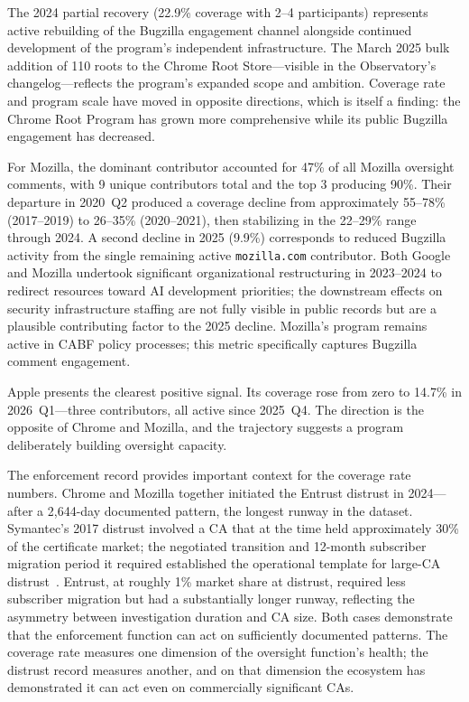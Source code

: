 \documentclass[10pt,twocolumn,letterpaper]{article}
\begin{document}
The 2024 partial recovery (22.9\% coverage with 2--4 participants)
represents active rebuilding of the Bugzilla engagement channel alongside
continued development of the program's independent infrastructure. The
March 2025 bulk addition of 110 roots to the Chrome Root Store---visible
in the Observatory's changelog---reflects the program's expanded scope and
ambition. Coverage rate and program scale have moved in opposite directions,
which is itself a finding: the Chrome Root Program has grown more
comprehensive while its public Bugzilla engagement has decreased.

For Mozilla, the dominant contributor accounted for 47\% of all Mozilla
oversight comments, with 9 unique contributors total and the top 3
producing 90\%. Their departure in 2020~Q2 produced a coverage decline
from approximately 55--78\% (2017--2019) to 26--35\% (2020--2021), then
stabilizing in the 22--29\% range through 2024. A second decline in 2025
(9.9\%) corresponds to reduced Bugzilla activity from the single remaining
active \texttt{mozilla.com} contributor. Both Google and Mozilla undertook
significant organizational restructuring in 2023--2024 to redirect
resources toward AI development priorities; the downstream effects on
security infrastructure staffing are not fully visible in public records
but are a plausible contributing factor to the 2025 decline. Mozilla's
program remains active in CABF policy processes; this metric specifically
captures Bugzilla comment engagement.

Apple presents the clearest positive signal. Its coverage rose from zero
to 14.7\% in 2026~Q1---three contributors, all active since 2025~Q4.
The direction is the opposite of Chrome and Mozilla, and the trajectory
suggests a program deliberately building oversight capacity.

The enforcement record provides important context for the coverage rate
numbers. Chrome and Mozilla together initiated the Entrust distrust in
2024---after a 2,644-day documented pattern, the longest runway in the
dataset. Symantec's 2017 distrust involved a CA that at the time held
approximately 30\% of the certificate market; the negotiated transition
and 12-month subscriber migration period it required established the
operational template for large-CA distrust~\cite{amann2017}. Entrust, at roughly 1\%
market share at distrust, required less subscriber migration but had a
substantially longer runway, reflecting the asymmetry between
investigation duration and CA size. Both cases demonstrate that the
enforcement function can act on sufficiently documented patterns. The
coverage rate measures one dimension of the oversight function's health;
the distrust record measures another, and on that dimension the ecosystem
has demonstrated it can act even on commercially significant CAs.
\end{document}

